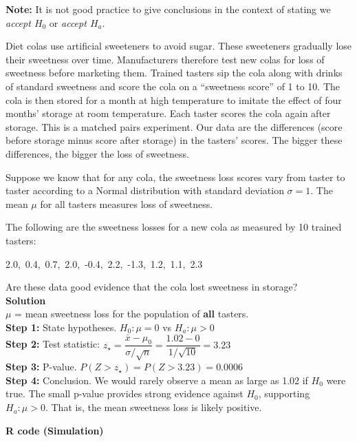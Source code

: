 \textbf{Note:} It is not good practice to give conclusions in the context of stating we \textit{accept $H_0$} or \textit{accept $H_a$}.
\begin{example}
Diet colas use artificial sweeteners to avoid sugar. These sweeteners gradually lose their sweetness over time. Manufacturers therefore test new colas for loss of sweetness before marketing them. Trained tasters sip the cola along with drinks of standard sweetness and score the cola on a “sweetness score” of 1 to 10. The cola is then stored for a month at high temperature to imitate the effect of four months’ storage at room temperature. Each taster scores the cola again after storage. This is a matched pairs experiment. Our data are the differences (score before storage minus score after storage) in the tasters’ scores. The bigger these differences, the bigger the loss of sweetness.

Suppose we know that for any cola, the sweetness loss scores vary from taster to taster according to a Normal distribution with standard deviation $\sigma = 1$. The mean $\mu$ for all tasters measures loss of sweetness.

The following are the sweetness losses for a new cola as measured by 10 trained tasters:

\medskip
\centerline{2.0,\ 0.4,\ 0.7,\ 2.0,\ -0.4,\ 2.2,\ -1.3,\ 1.2,\ 1.1,\ 2.3}
\medskip

Are these data good evidence that the cola lost sweetness in storage?\\
\noindent\textbf{Solution}\\

$\mu$ = mean sweetness loss for the population of \textbf{all} tasters.\\
\textbf{Step 1:} State hypotheses. $H_0: \mu = 0$ vs $H_a: \mu > 0$ \\
\textbf{Step 2:} Test statistic: $z_\star = \dfrac{\bar{x} - \mu_0}{\sigma / \sqrt{n}} = \dfrac{1.02 - 0}{1 / \sqrt{10}} = 3.23$ \\
\textbf{Step 3:} P-value. $P(Z > z_\star) = P(Z > 3.23) = 0.0006$ \\
\textbf{Step 4:} Conclusion. We would rarely observe a mean as large as 1.02 if $H_0$ were true. The small p-value provides strong evidence against $H_0$, supporting $H_a: \mu > 0$. That is, the mean sweetness loss is likely positive.

\vspace{1em}
\noindent\textbf{R code (Simulation)}


\end{example}
